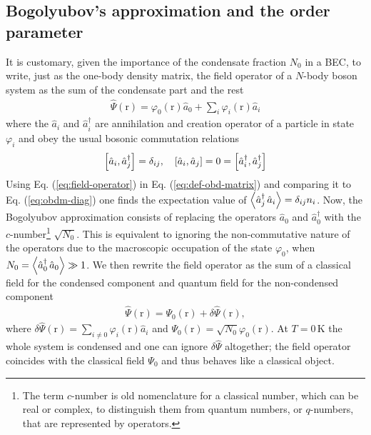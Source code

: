 \documentclass[12pt,a4paper]{book}
\renewcommand{\vec}[1]{\bm{\mathrm{#1}}}
\newcommand{\unit}[1]{\,\mathrm{#1}}
\begin{document}
		\subsection{Bogolyubov's approximation and the order parameter}\label{sec:bogol-order}
			It is customary, given the importance of the condensate fraction $N_0$ in a BEC, to write, just as the one-body density matrix, the field operator of a $N$-body boson system as the sum of the condensate part and the rest
			\begin{align}
				\hat{\Psi}(\vec{r})=\varphi_0(\vec{r})\hat{a}_0 + \sum_i \varphi_i(\vec{r})\hat{a}_i \label{eq:field-operator}
			\end{align}
			where the $\hat{a}_i$ and $\hat{a}_i^\dagger$ are annihilation and creation operator of a particle in state $\varphi_i$ and obey the usual bosonic commutation relations
			\begin{align}
				\commutator{\hat{a}_i}{\hat{a}_j^\dagger}=\delta_{ij},\quad 	\commutator{\hat{a}_i}{\hat{a}_j}=0=\commutator{\hat{a}_i^\dagger}{\hat{a}_j^\dagger}
			\end{align}
			Using Eq. (\ref{eq:field-operator}) in Eq. (\ref{eq:def-obd-matrix}) and comparing it to Eq. (\ref{eq:obdm-diag}) one finds the expectation value of $\expectationvalue{\hat{a}_j^\dagger\,\hat{a}_i}=\delta_{ij}n_i$. Now, the Bogolyubov approximation consists of replacing the operators $\hat{a}_0$ and $\hat{a}_0^\dagger$ with the $c$-number\footnote{The term $c$-number is old nomenclature for a classical number, which can be real or complex, to distinguish them from quantum numbers, or $q$-numbers, that are represented by operators.} $\sqrt{N_0}$. This is equivalent to ignoring the non-commutative nature of the operators due to the macroscopic occupation of the state $\varphi_0$, when $N_0=\expectationvalue{\hat{a}_0^\dagger\,\hat{a}_0}\gg 1$. We then rewrite the field operator as the sum of a classical field for the condensed component and quantum field for the non-condensed component
			\begin{align}
				\hat{\Psi}(\vec{r})=\Psi_0(\vec{r})+\delta\hat{\Psi}(\vec{r}),\label{eq:order-param-real}
			\end{align}
			where $\delta\hat{\Psi}(\vec{r})=\sum_{i\neq 0}\varphi_i(\vec{r})\hat{a}_i$ and $\Psi_0(\vec{r})=\sqrt{N_0}\varphi_0(\vec{r})$. At $T=0\unit{K}$ the whole system is condensed and one can ignore $\delta\hat{\Psi}$ altogether; the field operator coincides with the classical field $\Psi_0$ and thus behaves like a classical object.\\
			
\end{document}
